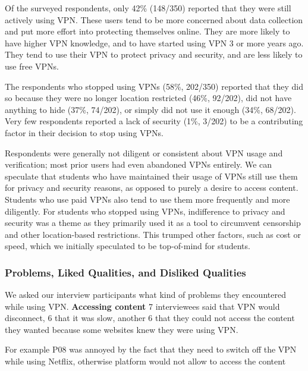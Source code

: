Of the surveyed respondents, only 42\% (148/350) reported that they were still
actively using VPN. These users tend to be more concerned about data
collection and put more effort into protecting themselves online. They are
more likely to have higher VPN knowledge, and to have started using VPN 3 or
more years ago. They tend to use their VPN to protect privacy and security,
and are less likely to use free VPNs.

The respondents who stopped using VPNs (58\%, 202/350) reported that they did
so because they were no longer location restricted (46\%, 92/202), did not
have anything to hide (37\%, 74/202), or simply did not use it enough (34\%,
68/202). Very few respondents reported a lack of security (1\%, 3/202) to be a
contributing factor in their decision to stop using VPNs.

Respondents were generally not diligent or consistent about VPN usage and
verification; most prior users had even abandoned VPNs entirely. We can
speculate that students who have maintained their usage of VPNs still use them
for privacy and security reasons, as opposed to purely a desire to access
content. Students who use paid VPNs also tend to use them more frequently and
more diligently. For students who stopped using VPNs, indifference to privacy
and security was a theme as they primarily used it as a tool to circumvent
censorship and other location-based restrictions. This trumped other factors,
such as cost or speed, which we initially speculated to be top-of-mind for
students.

\subsubsection{Problems, Liked Qualities, and Disliked Qualities} We asked our
interview participants what kind of problems they encountered while using VPN.
\textbf{Accessing content} 7 interviewees said that VPN would disconnect, 6
that it was slow, another 6 that they could not access the content they wanted
because some websites knew they were using VPN. 


For example P08 was annoyed by the fact that they need to switch off the VPN
while using Netflix, otherwise platform would not allow to access the content

